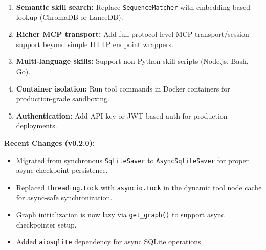 \documentclass[11pt,a4paper]{article}
\begin{document}
\begin{enumerate}[leftmargin=*]
  \item \textbf{Semantic skill search:} Replace \texttt{SequenceMatcher} with embedding-based lookup (ChromaDB or LanceDB).
  \item \textbf{Richer MCP transport:} Add full protocol-level MCP transport/session support beyond simple HTTP endpoint wrappers.
  \item \textbf{Multi-language skills:} Support non-Python skill scripts (Node.js, Bash, Go).
  \item \textbf{Container isolation:} Run tool commands in Docker containers for production-grade sandboxing.
  \item \textbf{Authentication:} Add API key or JWT-based auth for production deployments.
\end{enumerate}

\begin{notebox}
\textbf{Recent Changes (v0.2.0):}
\begin{itemize}[leftmargin=*]
  \item Migrated from synchronous \texttt{SqliteSaver} to \texttt{AsyncSqliteSaver} for proper async checkpoint persistence.
  \item Replaced \texttt{threading.Lock} with \texttt{asyncio.Lock} in the dynamic tool node cache for async-safe synchronization.
  \item Graph initialization is now lazy via \texttt{get\_graph()} to support async checkpointer setup.
  \item Added \texttt{aiosqlite} dependency for async SQLite operations.
\end{itemize}
\end{notebox}
\end{document}
